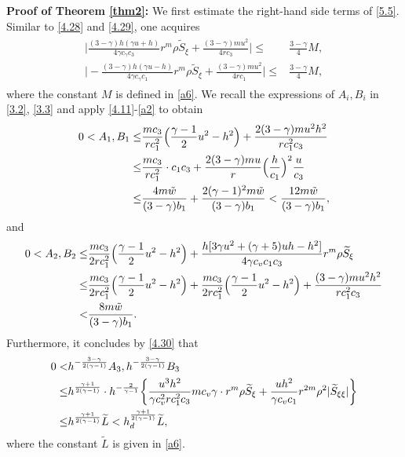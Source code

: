\documentclass[11pt,reqno]{article}
\newcommand{\fr}{\frac}
\numberwithin{equation}{section}
\begin{document}
\textbf{Proof of Theorem \ref{thm2}:} We first estimate the right-hand side terms of \eqref{5.5}. Similar to \eqref{4.28} and \eqref{4.29}, one acquires
\begin{align}\label{5.7}
\begin{split}
\bigg|\fr{(3-\gamma)h(\gamma u+h)}{4\gamma c_\gamma c_3}r^m\rho \widetilde{S}_\xi   +\fr{(3-\gamma)mu^2}{4rc_3}\bigg|\leq & \fr{3-\gamma}{4}M, \\
\bigg|-\fr{(3-\gamma)h(\gamma u-h)}{4\gamma c_\gamma c_1}r^m\rho \widetilde{S}_\xi  +\fr{(3-\gamma)mu^2}{4rc_1}\bigg| \leq & \fr{3-\gamma}{4}M,
\end{split}
\end{align}
where the constant $M$ is defined in \eqref{a6}. We recall the expressions of $A_i, B_i$ in \eqref{3.2}, \eqref{3.3} and apply \eqref{4.11}-\eqref{a2} to obtain
\begin{align}\label{5.8}
0<A_1,B_1\leq & \fr{mc_3}{rc_{1}^2}\Big(\fr{\gamma-1}{2}u^2-h^2\Big)+\fr{2(3-\gamma)mu^2h^2}{rc_{1}^2c_3} \notag \\
\leq & \fr{mc_3}{rc_{1}^2}\cdot c_1c_3+\fr{2(3-\gamma)mu}{r}\Big(\fr{h}{c_1}\Big)^2\fr{u}{c_3} \notag \\
\leq & \fr{4m\tilde{w}}{(3-\gamma)b_1}+\fr{2(\gamma-1)^2m\tilde{w}}{(3-\gamma)b_1}< \fr{12m\tilde{w}}{(3-\gamma)b_1},
\end{align}
and
\begin{align}\label{5.9}
0<A_2,B_2\leq & \fr{mc_3}{2rc_{1}^2}\Big(\fr{\gamma-1}{2}u^2-h^2\Big) +\fr{h[3\gamma u^2+(\gamma+5)uh-h^2]}{4\gamma c_v c_1c_3}r^m\rho \widetilde{S}_\xi \notag \\
\leq & \fr{mc_3}{2rc_{1}^2}\Big(\fr{\gamma-1}{2}u^2-h^2\Big) +\fr{mc_3}{2rc_{1}^2}\Big(\fr{\gamma-1}{2}u^2-h^2\Big) +\fr{(3-\gamma)mu^2h^2}{rc_{1}^2c_3} \notag \\ < & \fr{8m\tilde{w}}{(3-\gamma)b_1}.
\end{align}
Furthermore, it concludes by \eqref{4.30} that
\begin{align}\label{5.10}
0<&h^{-\fr{3-\gamma}{2(\gamma-1)}}A_3,h^{-\fr{3-\gamma}{2(\gamma-1)}}B_3 \notag \\
\leq & h^{\fr{\gamma+1}{2(\gamma-1)}}\cdot h^{-\fr{2}{\gamma-1}}\bigg\{\fr{u^3h^2}{\gamma c_{v}^2 r c_{1}^2 c_{3}}mc_v\gamma \cdot r^m\rho \widetilde{S}_\xi +\fr{uh^2}{\gamma c_v c_1}r^{2m}\rho^2|\widetilde{S}_{\xi\xi}|\bigg\} \notag \\
\leq & h^{\fr{\gamma+1}{2(\gamma-1)}} \widetilde{L}< h_{d}^{\fr{\gamma+1}{2(\gamma-1)}} \widetilde{L},
\end{align}
where the constant $\widetilde{L}$ is given in \eqref{a6}.
\end{document}
